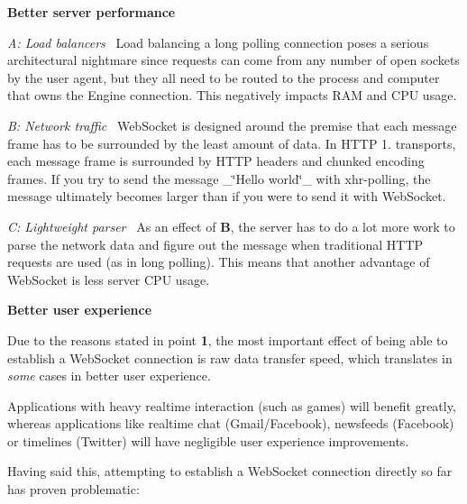 \begin{DoxyEnumerate}
\item {\bfseries Better server performance}
\begin{DoxyItemize}
\item {\itshape A\+: Load balancers}~\newline
 Load balancing a long polling connection poses a serious architectural nightmare since requests can come from any number of open sockets by the user agent, but they all need to be routed to the process and computer that owns the {\ttfamily Engine} connection. This negatively impacts R\+AM and C\+PU usage.
\item {\itshape B\+: Network traffic}~\newline
 Web\+Socket is designed around the premise that each message frame has to be surrounded by the least amount of data. In H\+T\+TP 1. transports, each message frame is surrounded by H\+T\+TP headers and chunked encoding frames. If you try to send the message \+\_\+\char`\"{}\+Hello world\char`\"{}\+\_\+ with xhr-\/polling, the message ultimately becomes larger than if you were to send it with Web\+Socket.
\item {\itshape C\+: Lightweight parser}~\newline
 As an effect of {\bfseries B}, the server has to do a lot more work to parse the network data and figure out the message when traditional H\+T\+TP requests are used (as in long polling). This means that another advantage of Web\+Socket is less server C\+PU usage.
\end{DoxyItemize}
\item {\bfseries Better user experience}

Due to the reasons stated in point {\bfseries 1}, the most important effect of being able to establish a Web\+Socket connection is raw data transfer speed, which translates in {\itshape some} cases in better user experience.

Applications with heavy realtime interaction (such as games) will benefit greatly, whereas applications like realtime chat (Gmail/\+Facebook), newsfeeds (Facebook) or timelines (Twitter) will have negligible user experience improvements.
\end{DoxyEnumerate}

Having said this, attempting to establish a Web\+Socket connection directly so far has proven problematic\+:


